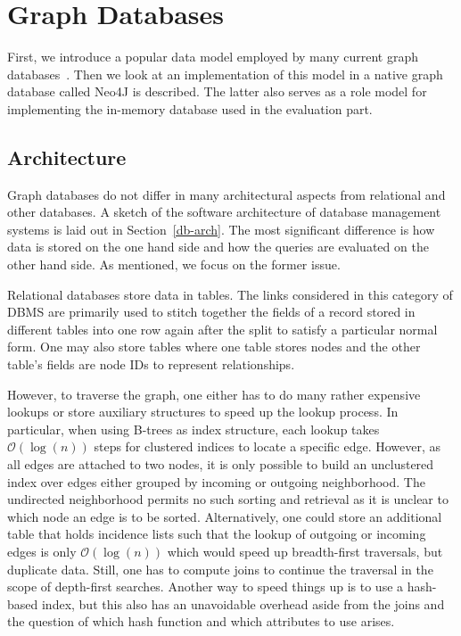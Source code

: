 \chapter{Graph Databases}
    First, we introduce a popular data model employed by many current graph databases~\autocite{GitHubneo4j, ArangoDB, AmazonNeptune, RedisGraph}.
    Then we look at an implementation of this model in a native graph database called Neo4J is described. 
    The latter also serves as a role model for implementing the in-memory database used in the evaluation part.
                
    \section{Architecture}
        Graph databases do not differ in many architectural aspects from relational and other databases. A sketch of the software architecture of database management systems is laid out in Section~\ref{db-arch}. 
        The most significant difference is how data is stored on the one hand side and how the queries are evaluated on the other hand side.
        As mentioned, we focus on the former issue.
        
        Relational databases store data in tables.
        The links considered in this category of DBMS are primarily used to stitch together the fields of a record stored in different tables into one row again after the split to satisfy a particular normal form.
        One may also store tables where one table stores nodes and the other table's fields are node IDs to represent relationships.

        However, to traverse the graph, one either has to do many rather expensive lookups or store auxiliary structures to speed up the lookup process.
        In particular, when using B-trees as index structure, each lookup takes $\mathcal{O}(\log(n))$ steps for clustered indices to locate a specific edge. However, as all edges are attached to two nodes, it is only possible to build an unclustered index over edges either grouped by incoming or outgoing neighborhood. The undirected neighborhood permits no such sorting and retrieval as it is unclear to which node an edge is to be sorted.
        Alternatively, one could store an additional table that holds incidence lists such that the lookup of outgoing or incoming edges is only $\mathcal{O}(\log(n))$ which would speed up breadth-first traversals, but duplicate data.
        Still, one has to compute joins to continue the traversal in the scope of depth-first searches.
        Another way to speed things up is to use a hash-based index, but this also has an unavoidable overhead aside from the joins and the question of which hash function and which attributes to use arises.
        
